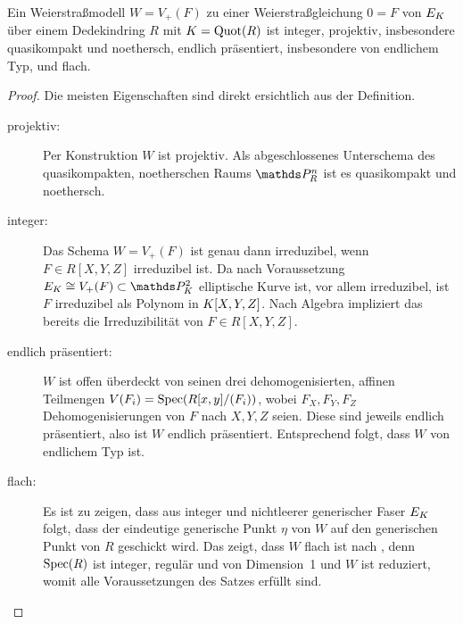 \begin{Lemma}\label{thm:eigweierstrassmodelle}
  Ein Weierstraßmodell $W=V_+(F)$ zu einer Weierstraßgleichung ${0=F}$
  von $E_{K}$ über einem Dedekindring $R$ mit $K=\operatorname{Quot}(R)$ ist
  integer,
  projektiv, insbesondere quasikompakt und noethersch,
  endlich präsentiert, insbesondere von endlichem Typ, und
  flach.
  \begin{proof}
    Die meisten Eigenschaften sind direkt ersichtlich aus der Definition.
    \begin{description}
    \item[projektiv:] Per Konstruktion $W$ ist projektiv. Als
      abgeschlossenes Unterschema des quasikompakten, noetherschen Raums
      $\P_R^n$ ist es quasikompakt und noethersch.
    \item[integer:]
      Das Schema $W=V_+(F)$ ist genau dann irreduzibel, wenn
      ${F\in R[X,Y,Z]}$ irreduzibel ist.
      Da nach Voraussetzung $E_\K\cong V_+(F)\subset\P_\K^2$
      elliptische Kurve ist, vor allem irreduzibel, ist $F$ irreduzibel
      als Polynom in $K[X,Y,Z]$. Nach Algebra impliziert das bereits
      die Irreduzibilität von $F\in R[X,Y,Z]$.
    \item[endlich präsentiert:]
      $W$ ist offen überdeckt von seinen drei dehomogenisierten,
      affinen Teilmengen $V(F_i)=\operatorname{Spec}(R[x,y]/(F_i))$, wobei $F_X,F_Y,F_Z$
      Dehomogenisierungen von $F$ nach $X,Y,Z$ seien. Diese sind jeweils
      endlich präsentiert, also ist $W$ endlich präsentiert.
      Entsprechend folgt, dass $W$ von endlichem Typ ist.
    \item[flach:]
      Es ist zu zeigen, dass aus integer und nichtleerer generischer
      Faser $E_{K}$ folgt, dass der eindeutige generische Punkt $\eta$
      von $W$ auf den generischen Punkt von $R$ geschickt wird.
      Das zeigt, dass $W$ flach ist
      nach \cite[Proposition~III.9.7]{hartshorne}, denn
      $\operatorname{Spec}(R)$ ist integer, regulär und von Dimension~1 und
      $W$ ist reduziert, womit alle Voraussetzungen des Satzes erfüllt
      sind.
      

\end{description}
\end{proof}
\end{Lemma}
